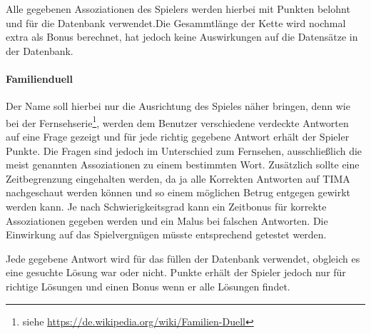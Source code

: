 Alle gegebenen Assoziationen des Spielers werden hierbei mit Punkten belohnt
und für die Datenbank verwendet.Die Gesammtlänge der Kette wird nochmal extra
als Bonus berechnet, hat jedoch keine Auswirkungen auf die Datensätze in der
Datenbank.

\paragraph{Familienduell}
Der Name soll hierbei nur die Ausrichtung des Spieles näher bringen,
denn wie bei der
Fernsehserie\footnote{siehe \url{https://de.wikipedia.org/wiki/Familien-Duell}},
werden dem Benutzer verschiedene verdeckte Antworten auf eine Frage gezeigt
und für jede richtig gegebene Antwort erhält der Spieler Punkte.
Die Fragen sind jedoch im Unterschied zum Fernsehen, ausschließlich die meist
genannten Assoziationen zu einem bestimmten Wort. Zusätzlich sollte eine
Zeitbegrenzung eingehalten werden, da ja alle Korrekten Antworten auf TIMA
nachgeschaut werden können und so einem möglichen Betrug entgegen gewirkt werden
kann. Je nach Schwierigkeitsgrad kann ein Zeitbonus für korrekte Assoziationen
gegeben werden und ein Malus bei falschen Antworten. Die Einwirkung auf das
Spielvergnügen müsste entsprechend getestet werden.

Jede gegebene Antwort wird für das füllen der Datenbank verwendet, obgleich
es eine gesuchte Lösung war oder nicht. Punkte erhält der Spieler jedoch nur
für richtige Lösungen und einen Bonus wenn er alle Lösungen findet.























